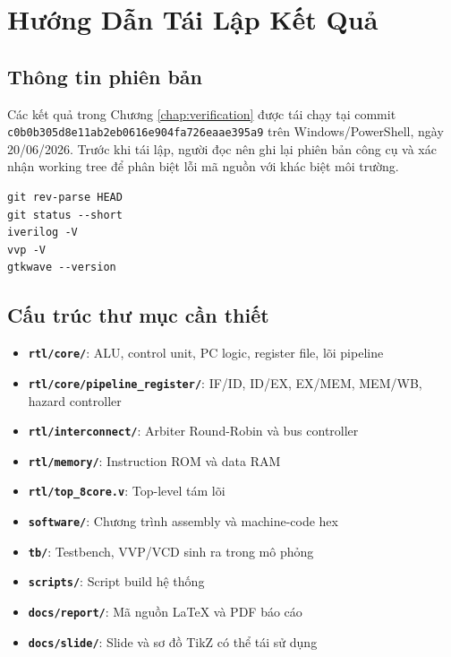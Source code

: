 \chapter{Hướng Dẫn Tái Lập Kết Quả}
\label{app:reproduce}

\section{Thông tin phiên bản}

Các kết quả trong Chương \ref{chap:verification} được tái chạy tại commit \texttt{c0b0b305d8e11ab2eb0616e904fa726eaae395a9} trên Windows/PowerShell, ngày 20/06/2026. Trước khi tái lập, người đọc nên ghi lại phiên bản công cụ và xác nhận working tree để phân biệt lỗi mã nguồn với khác biệt môi trường.

\begin{lstlisting}[language={},numbers=none,caption={Kiểm tra môi trường trước khi mô phỏng},label={lst:env_check}]
git rev-parse HEAD
git status --short
iverilog -V
vvp -V
gtkwave --version
\end{lstlisting}

\section{Cấu trúc thư mục cần thiết}

\begin{itemize}
    \item \textbf{\texttt{rtl/core/}}: ALU, control unit, PC logic, register file, lõi pipeline
    \item \textbf{\texttt{rtl/core/pipeline\_register/}}: IF/ID, ID/EX, EX/MEM, MEM/WB, hazard controller
    \item \textbf{\texttt{rtl/interconnect/}}: Arbiter Round-Robin và bus controller
    \item \textbf{\texttt{rtl/memory/}}: Instruction ROM và data RAM
    \item \textbf{\texttt{rtl/top\_8core.v}}: Top-level tám lõi
    \item \textbf{\texttt{software/}}: Chương trình assembly và machine-code hex
    \item \textbf{\texttt{tb/}}: Testbench, VVP/VCD sinh ra trong mô phỏng
    \item \textbf{\texttt{scripts/}}: Script build hệ thống
    \item \textbf{\texttt{docs/report/}}: Mã nguồn LaTeX và PDF báo cáo
    \item \textbf{\texttt{docs/slide/}}: Slide và sơ đồ TikZ có thể tái sử dụng
\end{itemize}


